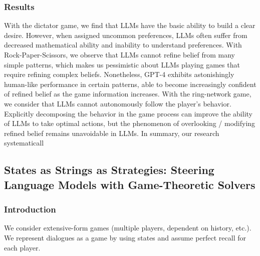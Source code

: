 \documentclass[12pt]{article}
\begin{document}
\subsubsection{Results}
With the dictator game, we find that
LLMs have the basic ability to build a clear desire. However,
when assigned uncommon preferences, LLMs often suffer
from decreased mathematical ability and inability to understand preferences. With Rock-Paper-Scissors, we observe
that LLMs cannot refine belief from many simple patterns,
which makes us pessimistic about LLMs playing games that
require refining complex beliefs. Nonetheless, GPT-4 exhibits astonishingly human-like performance in certain patterns, able to become increasingly confident of refined belief
as the game information increases. With the ring-network
game, we consider that LLMs cannot autonomously follow
the player's behavior. Explicitly decomposing the
behavior in the game process can improve the ability of
LLMs to take optimal actions, but the phenomenon of overlooking / modifying refined belief remains unavoidable in
LLMs.
In summary, our research systematicall
\subsection{States as Strings as Strategies: Steering Language Models with Game-Theoretic Solvers}
\subsubsection{Introduction}
We consider extensive-form games (multiple players, dependent on history, etc.). We represent dialogues as a game by using states and assume perfect recall for each player.
\end{document}
